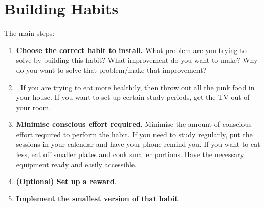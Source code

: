 \chapter{Building Habits}

The main steps:
\begin{enumerate}
	\item \textbf{Choose the correct habit to install.} What problem are you trying to
	solve by building this habit? What improvement do you want to make? Why do you
	want to solve that problem/make that improvement? 
	\item {}. If you are
	trying to eat more healthily, then throw out all the junk food in your house. If you
	want to set up certain study periods, get the TV  out of your room. 
	\item \textbf{Minimise conscious effort required}. Minimise the amount of conscious 
	effort required to perform the habit. If you need to study regularly, put the sessions
	in your calendar and have your phone remind you. If you want to eat less, eat off smaller 
	plates and cook smaller portions. Have the necessary equipment ready and easily accessible.
	\item \textbf{(Optional) Set up a reward}. 
	\item \textbf{Implement the smallest version of that habit}.  
\end{enumerate}